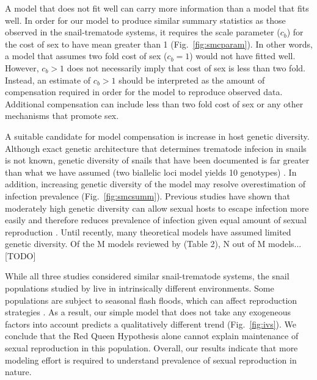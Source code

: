\documentclass{article}\usepackage[]{graphicx}\usepackage[]{color}
\newcommand{\fref}[1]{Fig.~\ref{fig:#1}}
\begin{document}
A model that does not fit well can carry more information than a model that fits well.
In order for our model to produce similar summary statistics as those observed in the snail-trematode systems, it requires the scale parameter ($c_b$) for the cost of sex to have mean greater than 1 (\fref{smcparam}).
In other words, a model that assumes two fold cost of sex ($c_b=1$) would not have fitted well.
However, $c_b > 1$ does not necessarily imply that cost of sex is less than two fold.
Instead, an estimate of $c_b > 1$ should be interpreted as the amount of compensation required in order for the model to reproduce observed data.
Additional compensation can include less than two fold cost of sex or any other mechanisms that promote sex.

A suitable candidate for model compensation is increase in host genetic diversity.
Although exact genetic architecture that determines trematode infecion in snails is not known, genetic diversity of snails that have been documented is far greater than what we have assumed (two biallelic loci model yields 10 genotypes) \citep{king2011parasites, dagan2013clonal}.
In addition, increasing genetic diversity of the model may resolve overestimation of infection prevalence (\fref{smcsumm}).
Previous studies have shown that moderately high genetic diversity can allow sexual hosts to escape infection more easily and therefore reduces prevalence of infection given equal amount of sexual reproduction \citep{lively2010effect, king2012does, ashby2015diversity}.
Until recently, many theoretical models have assumed limited genetic diversity.
Of the M models reviewed by \cite{ashby2015diversity} (Table 2), N out of M models... [TODO]

While all three studies \citep{dagan2013clonal, mckone2016fine, vergara2014infection} considered similar snail-trematode systems, the snail populations studied by \cite{dagan2013clonal} live in intrinsically different environments.
Some populations are subject to seasonal flash floods, which can affect reproduction strategies \citep{ben2007temporal}.
As a result, our simple model that does not take any exogeneous factors into account predicts a qualitatively different trend (\fref{ivs}).
We conclude that the Red Queen Hypothesis alone cannot explain maintenance of sexual reproduction in this population.
Overall, our results indicate that more modeling effort is required to understand prevalence of sexual reproduction in nature.
\end{document}

